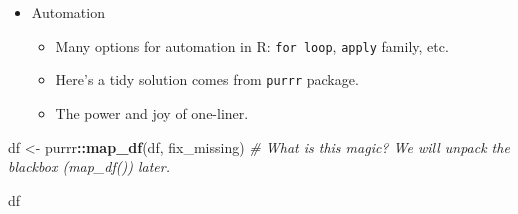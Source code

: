 \documentclass[
]{book}
\newenvironment{Shaded}{\begin{snugshade}}{\end{snugshade}}
\newcommand{\CommentTok}[1]{\textcolor[rgb]{0.56,0.35,0.01}{\textit{#1}}}
\newcommand{\ControlFlowTok}[1]{\textcolor[rgb]{0.13,0.29,0.53}{\textbf{#1}}}
\newcommand{\DecValTok}[1]{\textcolor[rgb]{0.00,0.00,0.81}{#1}}
\newcommand{\KeywordTok}[1]{\textcolor[rgb]{0.13,0.29,0.53}{\textbf{#1}}}
\newcommand{\NormalTok}[1]{#1}
\newcommand{\OperatorTok}[1]{\textcolor[rgb]{0.81,0.36,0.00}{\textbf{#1}}}
\newcommand{\OtherTok}[1]{\textcolor[rgb]{0.56,0.35,0.01}{#1}}
\newcommand{\StringTok}[1]{\textcolor[rgb]{0.31,0.60,0.02}{#1}}
\providecommand{\tightlist}{%
  \setlength{\itemsep}{0pt}\setlength{\parskip}{0pt}}
\begin{document}
\begin{Shaded}
\end{Shaded}

\begin{itemize}
\tightlist
\item
  Automation

  \begin{itemize}
  \tightlist
  \item
    Many options for automation in R: \texttt{for\ loop}, \texttt{apply} family, etc.
  \item
    Here's a tidy solution comes from \texttt{purrr} package.
  \item
    The power and joy of one-liner.
  \end{itemize}
\end{itemize}

\begin{Shaded}
\begin{Highlighting}[]
\NormalTok{df \textless{}{-}}\StringTok{ }\NormalTok{purrr}\OperatorTok{::}\KeywordTok{map\_df}\NormalTok{(df, fix\_missing) }\CommentTok{\# What is this magic? We will unpack the blackbox (\textasciigrave{}map\_df()\textasciigrave{}) later.}

\NormalTok{df}
\end{Highlighting}
\end{Shaded}
\end{document}
